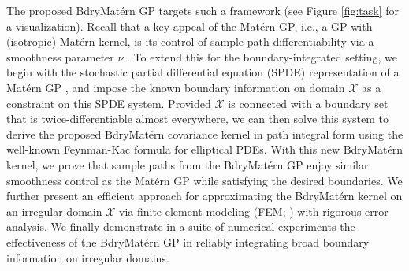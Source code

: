 \documentclass[aos,preprint]{imsart}
\theoremstyle{plain}
\theoremstyle{remark}
\begin{document}
The proposed BdryMat\'ern GP targets such a framework (see Figure \ref{fig:task} for a visualization). Recall that a key appeal of the Mat\'ern GP, i.e., a GP with (isotropic) Mat\'ern kernel, is its control of sample path differentiability via a smoothness parameter $\nu$ \citep{stein1999}. To extend this for the boundary-integrated setting, we begin with the stochastic partial differential equation (SPDE) representation of a Mat\'ern GP \citep{LindgrenRueLindstrom11}, and impose the known boundary information on domain $\mathcal{X}$ as a constraint on this SPDE system. Provided $\mathcal{X}$ is connected with a boundary set that is twice-differentiable almost everywhere, we can then solve this system to derive the proposed BdryMat\'ern covariance kernel in path integral form using the well-known Feynman-Kac formula \citep{ito1957fundamental,stroock1971diffusion,papanicolaou1990probabilistic} for elliptical PDEs. With this new BdryMat\'ern kernel, we prove that sample paths from the BdryMat\'ern GP enjoy similar smoothness control as the Mat\'ern GP while satisfying the desired boundaries. We further present an efficient approach for approximating the BdryMat\'ern kernel on an irregular domain $\mathcal{X}$ via finite element modeling (FEM; \cite{huebner2001finite}) with rigorous error analysis. We finally demonstrate in a suite of numerical experiments the effectiveness of the BdryMat\'ern GP in reliably integrating broad boundary information on irregular domains.

\end{document}

